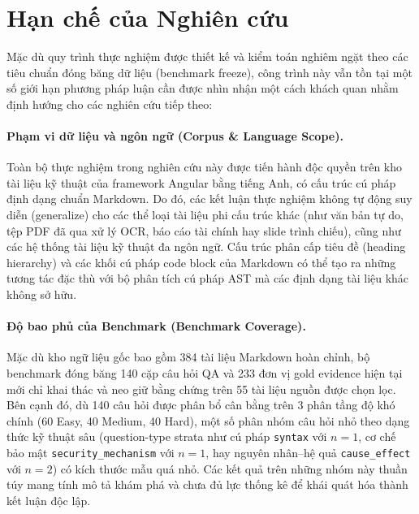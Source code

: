 
\section{Hạn chế của Nghiên cứu}
\label{sec:limitations}

Mặc dù quy trình thực nghiệm được thiết kế và kiểm toán nghiêm ngặt theo các tiêu chuẩn đóng băng dữ liệu (benchmark freeze), công trình này vẫn tồn tại một số giới hạn phương pháp luận cần được nhìn nhận một cách khách quan nhằm định hướng cho các nghiên cứu tiếp theo:

\paragraph{Phạm vi dữ liệu và ngôn ngữ (Corpus \& Language Scope).}
Toàn bộ thực nghiệm trong nghiên cứu này được tiến hành độc quyền trên kho tài liệu kỹ thuật của framework Angular bằng tiếng Anh, có cấu trúc cú pháp định dạng chuẩn Markdown. Do đó, các kết luận thực nghiệm không tự động suy diễn (generalize) cho các thể loại tài liệu phi cấu trúc khác (như văn bản tự do, tệp PDF đã qua xử lý OCR, báo cáo tài chính hay slide trình chiếu), cũng như các hệ thống tài liệu kỹ thuật đa ngôn ngữ. Cấu trúc phân cấp tiêu đề (heading hierarchy) và các khối cú pháp code block của Markdown có thể tạo ra những tương tác đặc thù với bộ phân tích cú pháp AST mà các định dạng tài liệu khác không sở hữu.

\paragraph{Độ bao phủ của Benchmark (Benchmark Coverage).}
Mặc dù kho ngữ liệu gốc bao gồm 384 tài liệu Markdown hoàn chỉnh, bộ benchmark đóng băng 140 cặp câu hỏi QA và 233 đơn vị gold evidence hiện tại mới chỉ khai thác và neo giữ bằng chứng trên 55 tài liệu nguồn được chọn lọc. Bên cạnh đó, dù 140 câu hỏi được phân bổ cân bằng trên 3 phân tầng độ khó chính (60 Easy, 40 Medium, 40 Hard), một số phân nhóm câu hỏi nhỏ theo dạng thức kỹ thuật sâu (question-type strata như cú pháp \texttt{syntax} với $n=1$, cơ chế bảo mật \texttt{security\_mechanism} với $n=1$, hay nguyên nhân--hệ quả \texttt{cause\_effect} với $n=2$) có kích thước mẫu quá nhỏ. Các kết quả trên những nhóm này thuần túy mang tính mô tả khám phá và chưa đủ lực thống kê để khái quát hóa thành kết luận độc lập.

